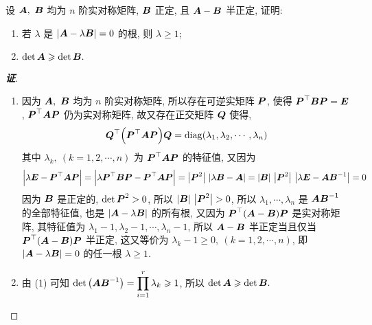 \begin{example}[2014 南京大学]
    设 $\vb*{A},~\vb*{B}$ 均为 $n$ 阶实对称矩阵, $\vb*{B}$ 正定, 且 $\vb*{A}-\vb*{B}$ 半正定, 证明:
    \begin{enumerate}[label=(\arabic{*})]
        \item 若 $\lambda$ 是 $|\vb*{A}-\lambda\vb*{B}|=0$ 的根, 则 $\lambda\geqslant 1$;
        \item $\det\vb*{A}\geqslant \det\vb*{B}.$
    \end{enumerate}
\end{example}
\begin{proof}[{\songti \textbf{证}}]
    \begin{enumerate}[label=(\arabic{*})]
        \item 因为 $\vb*{A},~\vb*{B}$ 均为 $n$ 阶实对称矩阵, 所以存在可逆实矩阵 $\vb*{P}$, 使得 $\vb*{P}^\top\vb*{BP}=\vb*{E}$, $\vb*{P}^\top\vb*{AP}$ 仍为实对称矩阵, 故又存在正交矩阵 $\vb*{Q}$ 使得,
              $$\vb*{Q}^\top\qty(\vb*{P}^\top\vb*{AP})\vb*{Q}=\mathrm{diag}(\lambda_1,\lambda_2,\cdots,\lambda_n)$$
              其中 $\lambda_k,~(k=1,2,\cdots,n)$ 为 $\vb*{P}^\top\vb*{AP}$ 的特征值, 又因为
              $$\qty|\lambda\vb*{E}-\vb*{P}^\top\vb*{AP}|=\qty|\lambda \vb*{P}^\top\vb*{BP}-\vb*{P}^\top\vb*{AP}|=\qty|\vb*{P}^2|~\qty|\lambda\vb*{B}-\vb*{A}|=|\vb*{B}|~\qty|\vb*{P}^2|~\qty|\lambda\vb*{E}-\vb*{AB}^{-1}|=0$$
              因为 $\vb*{B}$ 是正定的, $\det\vb*{P}^2>0$, 所以 $|\vb*{B}|~\qty|\vb*{P}^2|>0$, 所以 $\lambda_1,\cdots,\lambda_n$ 是 $\vb*{AB}^{-1}$ 的全部特征值, 也是 $|\vb*{A}-\lambda\vb*{B}|$ 的所有根,
              又因为 $\vb*{P}^\top(\vb*{A}-\vb*{B})\vb*{P}$ 是实对称矩阵, 其特征值为 $\lambda_1-1,\lambda_2-1,\cdots,\lambda_n-1$,
              所以 $\vb*{A}-\vb*{B}$ 半正定当且仅当 $\vb*{P}^\top(\vb*{A}-\vb*{B})\vb*{P}$ 半正定, 这又等价为 $\lambda_k-1\geqslant 0,~(k=1,2,\cdots,n)$, 即 $|\vb*{A}-\lambda\vb*{B}|=0$ 的任一根 $\lambda\geqslant 1.$
        \item 由 (1) 可知 $\det\qty(\vb*{AB}^{-1})=\displaystyle\prod_{i=1}^{r}\lambda_k\geqslant 1$, 所以 $\det\vb*{A}\geqslant \det\vb*{B}.$
    \end{enumerate}
\end{proof}

